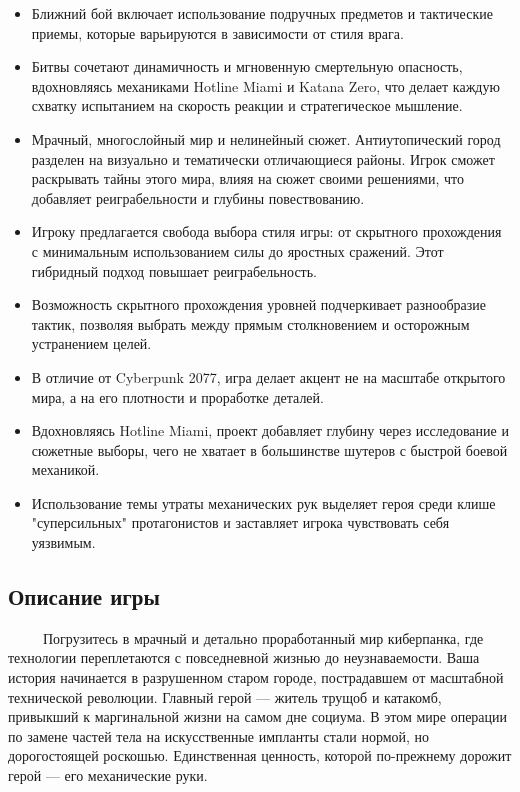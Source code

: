 \documentclass{article}
\begin{document}
\begin{itemize}
    \item Ближний бой включает использование подручных предметов и тактические приемы, которые варьируются в зависимости от стиля врага.
    \item Битвы сочетают динамичность и мгновенную смертельную опасность, вдохновляясь механиками Hotline Miami и Katana Zero, что делает каждую схватку испытанием на скорость реакции и стратегическое мышление.
    \item Мрачный, многослойный мир и нелинейный сюжет. Антиутопический город разделен на визуально и тематически отличающиеся районы. Игрок сможет раскрывать тайны этого мира, влияя на сюжет своими решениями, что добавляет реиграбельности и глубины повествованию.
    \item Игроку предлагается свобода выбора стиля игры: от скрытного прохождения с минимальным использованием силы до яростных сражений. Этот гибридный подход повышает реиграбельность.
    \item Возможность скрытного прохождения уровней подчеркивает разнообразие тактик, позволяя выбрать между прямым столкновением и осторожным устранением целей.
    \item В отличие от Cyberpunk 2077, игра делает акцент не на масштабе открытого мира, а на его плотности и проработке деталей.
    \item Вдохновляясь Hotline Miami, проект добавляет глубину через исследование и сюжетные выборы, чего не хватает в большинстве шутеров с быстрой боевой механикой.
    \item Использование темы утраты механических рук выделяет героя среди клише "суперсильных" протагонистов и заставляет игрока чувствовать себя уязвимым.
\end{itemize}

\subsection{Описание игры}
\ \ \ \ \ Погрузитесь в мрачный и детально проработанный мир киберпанка, где технологии переплетаются с повседневной жизнью до неузнаваемости. Ваша история начинается в разрушенном старом городе, пострадавшем от масштабной технической революции. Главный герой — житель трущоб и катакомб, привыкший к маргинальной жизни на самом дне социума. В этом мире операции по замене частей тела на искусственные импланты стали нормой, но дорогостоящей роскошью. Единственная ценность, которой по-прежнему дорожит герой — его механические руки.
\end{document}

